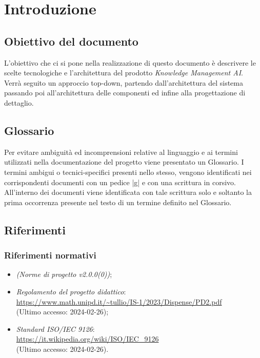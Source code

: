 \documentclass[10pt, a4paper]{article}
\title{\titolo}
\author{SWEetCode}
\begin{document}



\newpage

\tableofcontents
\newpage
\listoffigures
\newpage
\listoftables
\newpage

\section{Introduzione}
\subsection{Obiettivo del documento}
L'obiettivo che ci si pone nella realizzazione di questo documento è descrivere le scelte tecnologiche e l'architettura del prodotto \textit{Knowledge Management AI}. Verrà seguito un approccio top-down, partendo dall'architettura del sistema passando poi all'architettura delle componenti ed infine alla progettazione di dettaglio.

\subsection{Glossario}
Per evitare ambiguità ed incomprensioni relative al linguaggio e ai termini utilizzati nella documentazione del progetto viene presentato un Glossario.
I termini ambigui o tecnici-specifici presenti nello stesso, vengono identificati nei corrispondenti documenti con un pedice |g| e con una scrittura in corsivo.
All'interno dei documenti viene identificata con tale scrittura solo e soltanto la prima occorrenza presente nel testo di un termine definito nel Glossario.

\subsection{Riferimenti}
   \subsubsection{Riferimenti normativi}
   \begin{itemize}
    \item \textit{(Norme di progetto v2.0.0(0))};
    \item \textit{Regolamento del progetto didattico}: \\
        \url{https://www.math.unipd.it/~tullio/IS-1/2023/Dispense/PD2.pdf}\\
        (Ultimo accesso: 2024-02-26);
    \item \textit{Standard ISO/IEC 9126}:\\
        \url{https://it.wikipedia.org/wiki/ISO/IEC_9126}\\
        (Ultimo accesso: 2024-02-26).
    \end{itemize}
    
\end{document}
